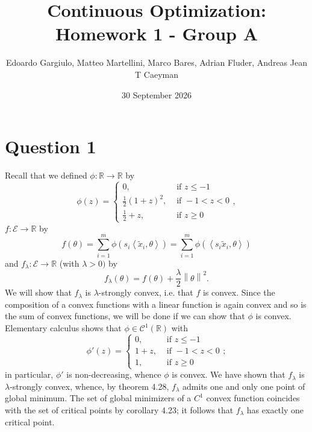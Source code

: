 \documentclass{article}
\title{Continuous Optimization: Homework 1 - Group A}
\author{Edoardo Gargiulo, Matteo Martellini, Marco Bares, Adrian Fluder, Andreas Jean T Caeyman}
\date{30 September 2026}
\theoremstyle{definition}
\theoremstyle{remark}
\newcommand{\R}{\mathbb{R}}
\newcommand \norm[1]{\left\lVert #1 \right\rVert}
\newcommand\inn [2]{\left\langle #1{,}#2\right\rangle}
\begin{document}
\maketitle
\section*{Question 1}
Recall that we defined $\phi\colon \R\to \R$ by $$\phi(z)=\begin{cases}
    0, &\text{ if }z\leq -1\\
    \frac 12 (1+z)^2, &\text{ if }-1<z<0\\
    \frac 12 +z, &\text{ if }z\geq 0
\end{cases},$$  $f\colon \mathcal E\to \R$  by $$f(\theta)=\sum\limits_{i=1}^m  \phi\left( s_i\inn{{\tilde{x}_i}}{\theta} \right)=\sum\limits_{i=1}^m  \phi\left( \inn{{s_i\tilde{x}_i}}{\theta} \right)$$
and $f_{\lambda}\colon \mathcal E\to \R$ (with $\lambda>0)$ by
$$
f_\lambda(\theta)=f(\theta)+\frac{\lambda}{2}\norm{\theta}^2.
$$
We will show that $f_\lambda$ is $\lambda$-strongly convex, i.e. that $f$ is convex. Since the composition of a convex functions with a linear function is again convex and so is the sum of convex functions, we will be done if we can show that $\phi$ is convex.
Elementary calculus shows that $\phi\in \mathcal C^1(\R) $ with
$$\phi'(z)=\begin{cases}
    0, &\text{ if }z\leq -1\\
     1+z, &\text{ if }-1<z<0\\
    1, &\text{ if }z\geq 0
\end{cases};$$
in particular, $\phi'$ is non-decreasing, whence $\phi$ is convex.
We have shown that $f_\lambda$ is $\lambda$-strongly convex, whence, by theorem 4.28, $f_\lambda$ admits one and only one point of global minimum.
The set of global minimizers of a $C^1$ convex function coincides with the set of critical points by corollary 4.23; it follows that $f_\lambda$ has exactly one critical point. 
\end{document}
